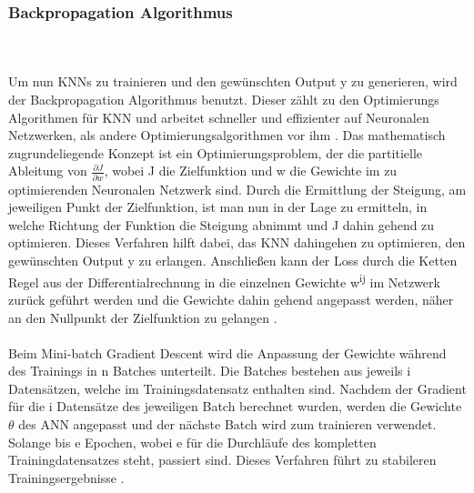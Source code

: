 \documentclass{llncs}
\begin{document}
\subsubsection{Backpropagation Algorithmus}\label{sec:test}
~\\\\
Um nun KNNs zu trainieren und den gewünschten Output y zu generieren, wird der Backpropagation Algorithmus benutzt. Dieser zählt zu den Optimierungs Algorithmen für KNN und arbeitet schneller und effizienter auf Neuronalen Netzwerken, als andere Optimierungsalgorithmen vor ihm \cite{backprob}. Das mathematisch zugrundeliegende Konzept ist ein Optimierungsproblem, der die partitielle Ableitung von  $\frac{\partial J}{\partial w}$, wobei J die Zielfunktion und w die Gewichte im zu optimierenden Neuronalen Netzwerk sind. Durch die Ermittlung der Steigung, am jeweiligen Punkt der Zielfunktion, ist man nun in der Lage zu ermitteln, in welche Richtung der Funktion die Steigung abnimmt und J dahin gehend zu optimieren. Dieses Verfahren hilft dabei, das KNN  dahingehen zu optimieren, den gewünschten Output y zu erlangen.  Anschließen kann der Loss durch die Ketten Regel aus der Differentialrechnung in die einzelnen Gewichte w\textsuperscript{ij} im Netzwerk zurück geführt werden und die Gewichte dahin gehend angepasst werden, näher an den Nullpunkt der Zielfunktion zu gelangen \cite{Grundlagen}.
\\\\
Beim Mini-batch Gradient Descent wird die Anpassung der Gewichte während des Trainings in n Batches unterteilt. Die Batches bestehen aus jeweils i Datensätzen, welche im  Trainingsdatensatz enthalten sind. Nachdem der Gradient für die i Datensätze des jeweiligen Batch berechnet wurden, werden die Gewichte $\theta$ des ANN angepasst und der nächste Batch wird zum trainieren verwendet. Solange bis e Epochen, wobei e für die Durchläufe des kompletten Trainingdatensatzes steht, passiert sind. Dieses Verfahren führt zu stabileren Trainingsergebnisse \cite{batchgradeint}.
\end{document}
